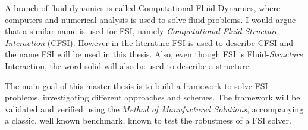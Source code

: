 A branch of fluid dynamics is called Computational Fluid Dynamics, where computers and numerical analysis is used to solve fluid problems.
I would argue that a similar name is used for FSI, namely \textit{Computational Fluid Structure Interaction} (CFSI). However in the literature FSI is used to describe CFSI and the name FSI will be used in this thesis. Also, even though FSI is Fluid-\textit{Structure} Interaction, the word solid will also be used to describe a structure. \newline

The main goal of this master thesis is to build a framework to solve FSI problems, investigating different approaches and schemes. The framework will be validated and verified using the \textit{Method of Manufactured Solutions}, accompanying a classic, well known benchmark, known to test the robustness of a FSI solver.

